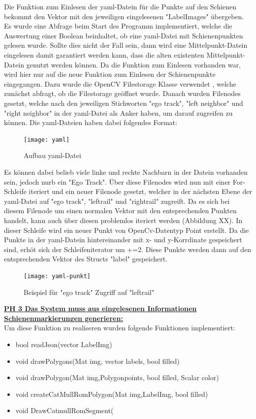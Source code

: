 \documentclass[11pt]{scrartcl}
\begin{document}
\noindent
Die Funktion zum Einlesen der yaml-Datein für die Punkte auf den Schienen bekommt den Vektor mit den jeweiligen eingelesenen "LabelImages" übergeben. Es wurde eine Abfrage beim Start des Programm implementiert, welche die Auswertung einer Boolean beinhaltet, ob eine yaml-Datei mit Schienenpunkten gelesen wurde. Sollte dies nicht der Fall sein, dann wird eine Mittelpunkt-Datein eingelesen damit garantiert werden kann, dass die alten existenten Mittelpunkt-Datein genutzt werden können. Da die Funktion zum Einlesen vorhanden war, wird hier nur auf die neue Funktion zum Einlesen der Schienenpunkte eingegangen. Dazu wurde die OpenCV Filestorage Klasse verwendet , welche zunächst abfragt, ob die Filestorage geöffnet wurde. Danach wurden Filenodes gesetzt, welche nach den jeweiligen Stichworten "ego track", "left neighbor" und "right neighbor" in der yaml-Datei als Anker haben, um darauf zugreifen zu können. Die yaml-Dateien haben dabei folgendes Format:
\begin{figure}[H]
  \texttt{[image: yaml]}
  \caption{Aufbau yaml-Datei}
\end{figure}
\noindent
Es können dabei belieb viele linke und rechte Nachbarn in der Datein vorhanden sein, jedoch nurb ein "Ego Track". Über diese Filenodes wird nun mit einer For-Schleife iteriert und ein neuer Filenode gesetzt, welcher in der nächsten Ebene der yaml-Datei auf "ego track", "leftrail" und "rightrail" zugreift. Da es sich bei diesem Filenode um einen normalen Vektor mit den entsprechenden Punkten handelt, kann auch über diesen problemlos iteriert werden (Abbildung XX). In dieser Schleife wird ein neuer Punkt von OpenCv-Datentyp Point erstellt. Da die Punkte in der yaml-Datein hintereinander mit x- und y-Korrdinate gespeichert sind, erhöt sich der Schleifeniterator um +=2. Diese Punkte werden dann auf den entsprechenden Vektor des Structs "label" gespeichert.
\begin{figure}[H]
  \texttt{[image: yaml-punkt]}
  \caption{Beispiel für "ego track" Zugriff auf "leftrail"}
\end{figure}
\noindent
\underline{\textbf {PH 3 Das System muss aus eingelesenen Informationen Schienenmarkierungen generieren:}}
\\

\noindent
Um diese Funktion zu realiseren wurden folgende Funktionen implementiert:
\begin{itemize}
	\item bool readJson(vector LabelImg)
	\item void drawPolygons(Mat img, vector labels, bool filled)
	\item void drawPolygon(Mat img,Polygonpoints, bool filled, Scalar color)
	\item void createCatMullRomPolygon(Mat img,LabelImg, bool filled)
	\item void DrawCatmullRomSegment(
\end{itemize}
\end{document}
